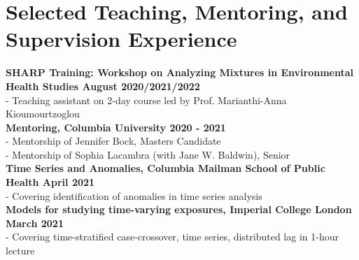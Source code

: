 \section*{Selected Teaching, Mentoring, and Supervision Experience}

\noindent \textbf{SHARP Training: Workshop on Analyzing Mixtures in Environmental Health Studies \hfill August 2020/2021/2022}\\
\noindent - Teaching assistant on 2-day course led by Prof. Marianthi-Anna Kioumourtzoglou\\

\noindent \textbf{Mentoring, Columbia University \hfill 2020 - 2021}\\
\noindent - Mentorship of Jennifer Bock, Masters Candidate\\
\noindent - Mentorship of Sophia Lacambra (with Jane W. Baldwin), Senior\\

\noindent \textbf{Time Series and Anomalies, Columbia Mailman School of Public Health \hfill April 2021}\\
\noindent - Covering identification of anomalies in time series analysis\\


\noindent \textbf{Models for studying time-varying exposures, Imperial College London \hfill March 2021}\\
\noindent - Covering time-stratified case-crossover, time series, distributed lag in 1-hour lecture\\



